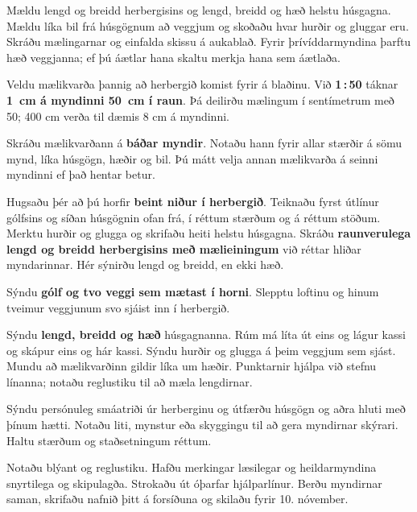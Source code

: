 \documentclass[12pt,a4paper]{article}
\newcommand{\skiladagur}{10. nóvember}
\newcommand{\verkthattur}[1]{\par\vspace{3.5mm}{\bfseries\large #1\par}\vspace{1.5mm}}
\begin{document}
\begingroup
\fontsize{11.5}{14}\selectfont
\verkthattur{1. Mældu og skráðu}
Mældu lengd og breidd herbergisins og lengd, breidd og hæð helstu húsgagna. Mældu líka bil frá húsgögnum að veggjum og skoðaðu hvar hurðir og gluggar eru. Skráðu mælingarnar og einfalda skissu á aukablað. Fyrir þrívíddarmyndina þarftu hæð veggjanna; ef þú áætlar hana skaltu merkja hana sem áætlaða.

\verkthattur{2. Veldu mælikvarða}
Veldu mælikvarða þannig að herbergið komist fyrir á blaðinu. Við \textbf{1\,:\,50} táknar \textbf{1~cm á myndinni 50~cm í raun}. Þá deilirðu mælingum í sentímetrum með 50; 400 cm verða til dæmis 8 cm á myndinni.

\vspace{2mm}
Skráðu mælikvarðann á \textbf{báðar myndir}. Notaðu hann fyrir allar stærðir á sömu mynd, líka húsgögn, hæðir og bil. Þú mátt velja annan mælikvarða á seinni myndinni ef það hentar betur.

\verkthattur{3. Teiknaðu í tvívídd á rúðublaðið}
Hugsaðu þér að þú horfir \textbf{beint niður í herbergið}. Teiknaðu fyrst útlínur gólfsins og síðan húsgögnin ofan frá, í réttum stærðum og á réttum stöðum. Merktu hurðir og glugga og skrifaðu heiti helstu húsgagna. Skráðu \textbf{raunverulega lengd og breidd herbergisins með mælieiningum} við réttar hliðar myndarinnar. Hér sýnirðu lengd og breidd, en ekki hæð.

\verkthattur{4. Teiknaðu í þrívídd á punktablaðið}
Sýndu \textbf{gólf og tvo veggi sem mætast í horni}. Slepptu loftinu og hinum tveimur veggjunum svo sjáist inn í herbergið.

\vspace{2mm}
Sýndu \textbf{lengd, breidd og hæð} húsgagnanna. Rúm má líta út eins og lágur kassi og skápur eins og hár kassi. Sýndu hurðir og glugga á þeim veggjum sem sjást. Mundu að mælikvarðinn gildir líka um hæðir. Punktarnir hjálpa við stefnu línanna; notaðu reglustiku til að mæla lengdirnar.

\verkthattur{5. Sýndu frumleika og vandaðu frágang}
Sýndu persónuleg smáatriði úr herberginu og útfærðu húsgögn og aðra hluti með þínum hætti. Notaðu liti, mynstur eða skyggingu til að gera myndirnar skýrari. Haltu stærðum og staðsetningum réttum.

\vspace{2mm}
Notaðu blýant og reglustiku. Hafðu merkingar læsilegar og heildarmyndina snyrtilega og skipulagða. Strokaðu út óþarfar hjálparlínur. Berðu myndirnar saman, skrifaðu nafnið þitt á forsíðuna og skilaðu fyrir \skiladagur.
\endgroup
\end{document}
